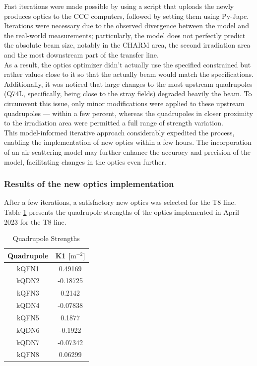 Fast iterations were made possible by using a script that uploads the newly produces optics to the CCC computers, followed by setting them using Py-Japc. Iterations were necessary due to the observed divergence between the model and the real-world measurements; particularly, the model does not perfectly predict the absolute beam size, notably in the CHARM area, the second irradiation area and the most downstream part of the transfer line.
\\

As a result, the optics optimizer didn't actually use the specified constrained but rather values close to it so that the actually beam would match the specifications. Additionally, it was noticed that large changes to the most upstream quadrupoles (Q74L, specifically, being close to the stray fields) degraded heavily the beam. To circumvent this issue, only minor modifications were applied to these upstream quadrupoles --- within a few percent, whereas the quadrupoles in closer proximity to the irradiation area were permitted a full range of strength variation.
\\

This model-informed iterative approach considerably expedited the process, enabling the implementation of new optics within a few hours. The incorporation of an air scattering model may further enhance the accuracy and precision of the model, facilitating changes in the optics even further.


\subsubsection{Results of the new optics implementation}

After a few iterations, a satisfactory new optics was selected for the T8 line. Table \ref{table:New optics quadrupole strenghts} presents the quadrupole strengths of the optics implemented in April 2023 for the T8 line.

\begin{table}[htbp]
    \centering
    \caption{Quadrupole Strengths}
    \begin{tabular}{cc}
        \hline
        Quadrupole & K1 [$\text{m}^{-2}$] \\
        \hline
        kQFN1 & 0.49169 \\
        kQDN2 & -0.18725 \\
        kQFN3 & 0.2142 \\
        kQDN4 & -0.07838 \\
        kQFN5 & 0.1877 \\
        kQDN6 & -0.1922 \\
        kQDN7 & -0.07342 \\
        kQFN8 & 0.06299 \\
        \hline
    \end{tabular}
    \label{table:New optics quadrupole strenghts}
\end{table}

